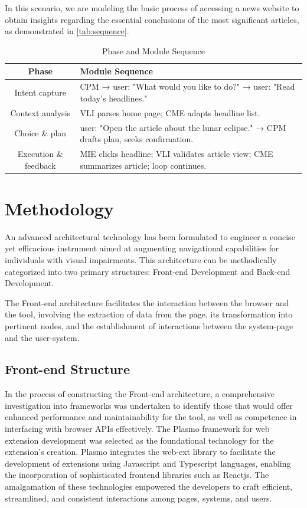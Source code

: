 \documentclass[conference]{IEEEtran}
\begin{document}
In this scenario, we are modeling the basic process of accessing a news website to obtain insights regarding the essential conclusions of the most significant articles, as demonstrated in \autoref{tab:sequence}.

\vfill
\begin{table}[ht]
\centering
\caption{Phase and Module Sequence}
\label{tab:sequence}
\footnotesize
\renewcommand{\arraystretch}{2}
\begin{tabular}{|c|p{5.5cm}|}
\hline
\textbf{Phase} & \textbf{Module Sequence} \\
\hline
Intent capture & CPM → user: "What would you like to do?" → user: "Read today's headlines." \\
\hline
Context analysis & VLI parses home page; CME adapts headline list. \\
\hline
Choice \& plan & user: "Open the article about the lunar eclipse." → CPM drafts plan, seeks confirmation. \\
\hline
Execution \& feedback & MIE clicks headline; VLI validates article view; CME summarizes article; loop continues. \\
\hline
\end{tabular}
\vspace{0.5cm}
\end{table}

\section{Methodology}\label{methodology}

An advanced architectural technology has been formulated to engineer a concise yet efficacious instrument aimed at augmenting navigational capabilities for individuals with visual impairments. This architecture can be methodically categorized into two primary structures: Front-end Development and Back-end Development.

The Front-end architecture facilitates the interaction between the browser and the tool, involving the extraction of data from the page, its transformation into pertinent nodes, and the establishment of interactions between the system-page and the user-system.

\subsection{Front-end Structure}

In the process of constructing the Front-end architecture, a comprehensive investigation into frameworks was undertaken to identify those that would offer enhanced performance and maintainability for the tool, as well as competence in interfacing with browser APIs effectively. The Plasmo framework for web extension development was selected as the foundational technology for the extension's creation. Plasmo integrates the web-ext library to facilitate the development of extensions using Javascript and Typescript languages, enabling the incorporation of sophisticated frontend libraries such as Reactjs. The amalgamation of these technologies empowered the developers to craft efficient, streamlined, and consistent interactions among pages, systems, and users.
\end{document}
